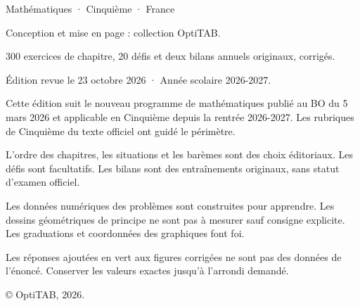 \thispagestyle{empty}\vspace*{\fill}
\begin{minipage}{128mm}\fontsize{9}{13}\selectfont\color{otMuted}
{\otSemi\color{otInk}Mathématiques · Cinquième · France}\par\medskip
Conception et mise en page : collection OptiTAB.\par
300 exercices de chapitre, 20 défis et deux bilans annuels originaux, corrigés.\par
Édition revue le 23 octobre 2026 · Année scolaire 2026-2027.\par\bigskip
Cette édition suit le nouveau programme de mathématiques publié au BO
du 5 mars 2026 et applicable en Cinquième depuis la rentrée 2026-2027.
Les rubriques de Cinquième du texte officiel ont guidé le périmètre.\par\bigskip
L’ordre des chapitres, les situations et les barèmes sont des choix éditoriaux.
Les défis sont facultatifs. Les bilans sont des entraînements originaux,
sans statut d’examen officiel.\par\bigskip
Les données numériques des problèmes sont construites pour apprendre.
Les dessins géométriques de principe ne sont pas à mesurer sauf consigne
explicite. Les graduations et coordonnées des graphiques font foi.\par\bigskip
Les réponses ajoutées en vert aux figures corrigées ne sont pas des données
de l’énoncé. Conserver les valeurs exactes jusqu’à l’arrondi demandé.\par\bigskip
© OptiTAB, 2026.\par\otSite
\end{minipage}\clearpage

